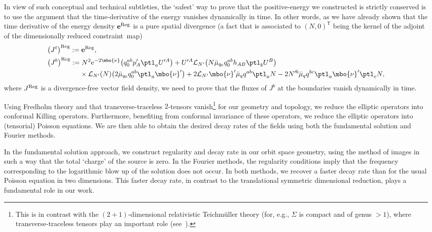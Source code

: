 In view of such conceptual and technical subtleties, the `safest' way to prove that the positive-energy  we constructed is strictly conserved is to use the argument that the time-derivative of the energy  vanishes dynamically in time. In other words, as we have already shown that the time derivative of the energy density $\mathbf{e}^{{\rm Reg}}$ is a pure spatial divergence (a fact that is associated to $(N, 0)^{\mathsf{T}}$ being the kernel of the adjoint of the dimensionally reduced constraint~map)
\begin{align*}
&\bigl(J^ t\bigr)^ {{\rm Reg}}:= \mathbf{e}^{{\rm Reg}}, \notag\\
&\bigl(J^b\bigr)^{{\rm Reg}}:= N^2 {\rm e}^{-2 \mbo{\nu}}\bigl(q_{0}^{ab} p'_A \ptl_a U'^A\bigr) + U'^A \mathcal{L}_{N'} \bigl(N\bar{\mu}_{q_0} q^{ab}_0 h_{AB} \ptl_b U^B\bigr) \notag\\
&\hphantom{\bigl(J^b\bigr)^{{\rm Reg}}:=}{}\times \mathcal{L}_{N'} (N) \bigl(2 \bar{\mu}_{q_0} q_{0}^{ab} \ptl_a \mbo{\nu}'\bigr) + 2 \mathcal{L}_{N'} \mbo{\nu}' \bar{\mu}_q q^{ab} \ptl_a N - 2 N'^b \bar{\mu}_q q^{bc} \ptl_a \mbo{\nu}' \ptl_c N,
\end{align*}
where $J^{{\rm Reg}}$ is a divergence-free vector field density, we need to prove that the fluxes of $J^b$ at the boundaries vanish dynamically in time.

Using Fredholm theory and that transverse-traceless $2$-tensors
vanish\footnote{This is in contrast with the $(2+1)$-dimensional relativistic Teichm\"uller theory (for, e.g., $\Sigma$ is compact and of genus $>1$), where transverse-traceless tensors play an important role (see~\cite{Moncrief_2007}).} for our geometry and topology, we reduce the elliptic operators into conformal Killing operators. Furthermore, benefiting from conformal invariance of these operators, we reduce the elliptic operators into (tensorial) Poisson equations. We are then able to obtain the desired decay rates of the fields using both the fundamental solution and Fourier methods.

In the fundamental solution approach, we construct regularity and decay rate in our orbit space geometry, using the method of images in such a way that the total `charge' of the source is zero. In the Fourier methods, the regularity conditions imply that the frequency corresponding to the logarithmic blow up of the solution does not occur. In both methods, we recover a faster decay rate than for the usual Poisson equation in two dimensions. This faster decay rate, in contrast to the translational symmetric dimensional reduction, plays a fundamental role in our work.

